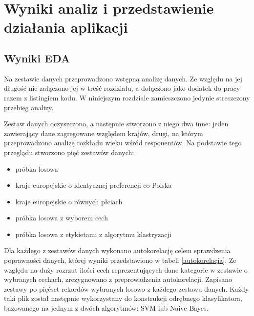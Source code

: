 \documentclass[12pt,a4paper,oneside]{report} %
\begin{document}
\chapter{Wyniki analiz i przedstawienie działania aplikacji}



\section{Wyniki EDA}

Na zestawie danych przeprowadzono wstępną analizę danych. Ze względu na jej długość nie załączono jej w treść rozdziału, a dołączono jako dodatek do pracy razem z listingiem kodu. W niniejszym rozdziale zamieszczono jedynie streszczony przebieg analizy. \par

Zestaw danych oczyszczono, a następnie stworzono z niego dwa inne: jeden zawierający dane zagregowane względem krajów, drugi, na którym przeprowadzono analizę rozkładu wieku wśród responentów.  Na podstawie tego przeglądu stworzono pięć zestawów danych: \par

\begin{itemize}
\item próbka losowa
\item kraje europejskie o identycznej preferencji co Polska
\item kraje europejskie o równych płciach
\item próbka losowa z wyborem cech
\item próbka losowa z etykietami z algorytmu klastryzacji
\end{itemize}

Dla każdego z zestawów danych wykonano autokorelację celem sprawdzenia poprawności danych, której wyniki przedstawiono w tabeli \ref{autokorelacja}. Ze względu na duży rozrzut ilości cech reprezentujących dane kategorie w zestawie o wybranych cechach, zrezygnowano z preprowadzenia autokorelacji. Zapisano zestawy po pięćset rekordów wybranych losowo z każdego zestawu danych. Każdy taki plik został następnie wykorzystany do konstrukcji odrębnego klasyfikatora, bazowanego na jednym z dwóch algorytmów: SVM lub Naive Bayes.\par
\end{document}
